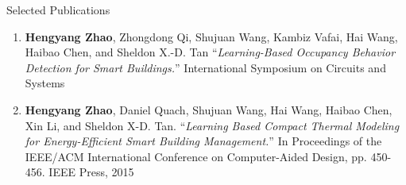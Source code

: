 \documentclass{resume} %
\begin{document}

\begin{rSection}{Selected Publications}

\begin{enumerate}

    \item \textbf{Hengyang Zhao}, Zhongdong Qi, Shujuan Wang, Kambiz Vafai, Hai
        Wang, Haibao Chen, and Sheldon X.-D. Tan ``\textit{Learning-Based
        Occupancy Behavior Detection for Smart Buildings.}'' International
        Symposium on Circuits and Systems

    \item \textbf{Hengyang Zhao}, Daniel Quach, Shujuan Wang, Hai Wang, Haibao
        Chen, Xin Li, and Sheldon X-D. Tan. ``\textit{Learning Based Compact
        Thermal Modeling for Energy-Efficient Smart Building Management.}'' In
        Proceedings of the IEEE/ACM International Conference on Computer-Aided
        Design, pp.  450-456. IEEE Press, 2015

\end{enumerate}

\end{rSection}
\end{document}
